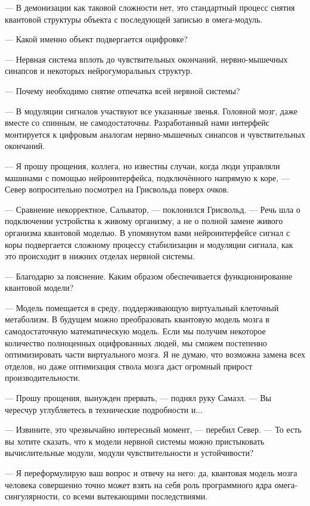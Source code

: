 --- В демонизации как таковой сложности нет, это стандартный процесс снятия квантовой структуры объекта с последующей записью в омега-модуль.

--- Какой именно объект подвергается оцифровке?

--- Нервная система вплоть до чувствительных окончаний, нервно-мышечных синапсов и некоторых нейрогуморальных структур.

--- Почему необходимо снятие отпечатка всей нервной системы?

--- В модуляции сигналов участвуют все указанные звенья.
Головной мозг, даже вместе со спинным, не самодостаточны.
Разработанный нами интерфейс монтируется к цифровым аналогам нервно-мышечных синапсов и чувствительных окончаний.

--- Я прошу прощения, коллега, но известны случаи, когда люди управляли машинами с помощью нейроинтерфейса, подключённого напрямую к коре, --- Север вопросительно посмотрел на Грисвольда поверх очков.

--- Сравнение некорректное, Сальватор, --- поклонился Грисвольд.
--- Речь шла о подключении устройства к живому организму, а не о полной замене живого организма квантовой моделью.
В упомянутом вами нейроинтерфейсе сигнал с коры подвергается сложному процессу стабилизации и модуляции сигнала, как это происходит в нижних отделах нервной системы.

--- Благодарю за пояснение.
Каким образом обеспечивается функционирование квантовой модели?

--- Модель помещается в среду, поддерживающую виртуальный клеточный метаболизм.
В будущем можно преобразовать квантовую модель мозга в самодостаточную математическую модель.
Если мы получим некоторое количество полноценных оцифрованных людей, мы сможем постепенно оптимизировать части виртуального мозга.
Я не думаю, что возможна замена всех отделов, но даже оптимизация ствола мозга даст огромный прирост производительности.

--- Прошу прощения, вынужден прервать, --- поднял руку Самаэл.
--- Вы чересчур углубляетесь в технические подробности и...

--- Извините, это чрезвычайно интересный момент, --- перебил Север.
--- То есть вы хотите сказать, что к модели нервной системы можно пристыковать вычислительные модули, модули чувствительности и устойчивости?

--- Я переформулирую ваш вопрос и отвечу на него: да, квантовая модель мозга человека совершенно точно может взять на себя роль программного ядра омега-сингулярности, со всеми вытекающими последствиями.

